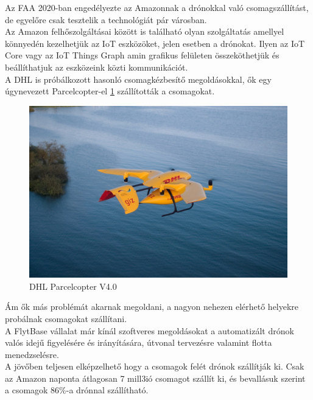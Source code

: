 Az FAA 2020-ban engedélyezte az Amazonnak a drónokkal való csomagszállítást, de egyelőre csak tesztelik a technológiát pár városban.\\
Az Amazon felhőszolgáltásai között is található olyan szolgáltatás amellyel könnyedén kezelhetjük az IoT eszközöket, jelen esetben a drónokat.
Ilyen az IoT Core vagy az IoT Things Graph amin grafikus felületen összeköthetjük és beállíthatjuk az eszközeink közti kommunikációt. \\
A DHL is próbálkozott hasonló csomagkézbesítő megoldásokkal, ők egy úgynevezett  Parcelcopter-el \ref{fig:parcelcopter} szállították a csomagokat.

\begin{figure}[h]
    \centering
    \includegraphics[scale=1.0]{images/parcelcopter.jpeg}
    \caption{DHL Parcelcopter V4.0}
    \label{fig:parcelcopter}
\end{figure}
Ám ők más problémát akarnak megoldani, a nagyon nehezen elérhető helyekre probálnak csomagokat szállítani.\\
A FlytBase \cite{flyt} vállalat már kínál szoftveres megoldásokat a automatizált drónok valós idejű figyelésére és irányítására, útvonal tervezésre valamint flotta menedzselésre.\\
A jövőben teljesen elképzelhető hogy a csomagok felét drónok szállítják ki. Csak az Amazon naponta átlagosan 7 mill3ió csomagot szállít ki,
és bevallásuk szerint a csomagok 86\%-a drónnal szállítható.


